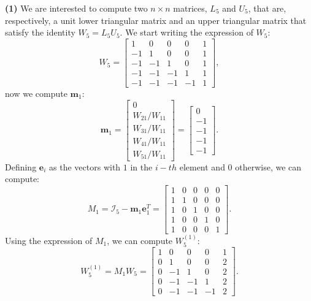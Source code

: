 \documentclass[a4paper]{report}
\numberwithin{equation}{chapter}
\begin{document}
\noindent \textbf{(1)} We are interested to compute two $n \times n$ matrices, $L_5$ and $U_5$, that are, respectively, a unit lower triangular matrix and an upper triangular matrix that satisfy the identity $W_5 = L_5 U_5$. We start writing the expression of $W_5$:
\begin{equation}\label{key}
	W_5 = 
	\begin{bmatrix}
		1 & 0  & 0  & 0  & 1  \\
		-1 & 1 & 0 & 0 & 1 \\
		-1 & -1 & 1 & 0 & 1 \\
		-1 & -1 & -1 & 1 & 1 \\
		-1 & -1 & -1 & -1 & 1 
	\end{bmatrix},
\end{equation}
now we compute $\textbf{m}_1$:
\begin{equation}\label{key}
	\textbf{m}_1 = 
	\begin{bmatrix}
		0\\
		{W_{21}}/{W_{11}}\\
		{W_{31}}/{W_{11}}\\
		{W_{41}}/{W_{11}}\\
		{W_{51}}/{W_{11}}
	\end{bmatrix}=
	\begin{bmatrix}
	0\\
	-1\\
	-1\\
	-1\\
	-1
\end{bmatrix}.
\end{equation}
Defining $\textbf{e}_i$ as the vectors with $1$ in the $i-th$ element and $0$ otherwise, we can compute:
\begin{equation}\label{key}
	M_1=\mathcal{I}_5 - \textbf{m}_1 \textbf{e}_1^T =
		\begin{bmatrix}
		1 & 0  & 0  & 0  & 0  \\
		1 & 1 & 0 & 0 & 0\\
		1 & 0 & 1 & 0 & 0 \\
		1 & 0 & 0 & 1 & 0 \\
		1 & 0 & 0 & 0 & 1 
	\end{bmatrix}.
\end{equation}
Using the expression of $M_1$, we can compute $W_5^{(1)}$:
\begin{equation}\label{key}
	W_5^{(1)} = M_1 W_5 = 
	\begin{bmatrix}
		1 & 0  & 0  & 0  & 1  \\
		0 & 1 & 0 & 0 & 2 \\
		0 & -1 & 1 & 0 & 2 \\
		0 & -1 & -1 & 1 & 2 \\
		0 & -1 & -1 & -1 & 2 
	\end{bmatrix}.
\end{equation}
\end{document}
